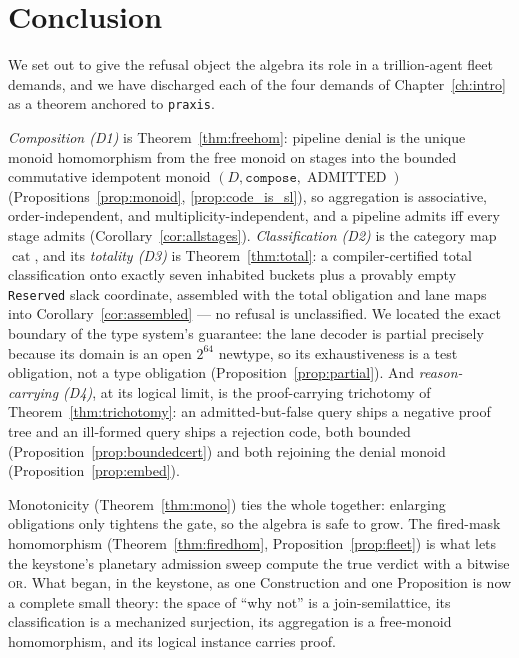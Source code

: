 \documentclass[11pt,oneside]{book}
\theoremstyle{definition}
\theoremstyle{plain}
\theoremstyle{remark}
\newcommand{\code}[1]{\texttt{#1}}
\newcommand{\Deny}{D}                 %
\newcommand{\Adml}{\operatorname{ADMITTED}}          %
\DeclareMathOperator{\catop}{cat}
\begin{document}
\chapter{Conclusion}
\label{ch:concl}

We set out to give the refusal object the algebra its role in a trillion-agent fleet demands, and we have discharged each of the four demands of Chapter~\ref{ch:intro} as a theorem anchored to \code{praxis}. %

\emph{Composition (D1)} is Theorem~\ref{thm:freehom}: pipeline denial is the unique monoid homomorphism from the free monoid on stages into the bounded commutative idempotent monoid $(\Deny,\code{compose},\Adml)$ (Propositions~\ref{prop:monoid}, \ref{prop:code_is_sl}), so aggregation is associative, order-independent, and multiplicity-independent, and a pipeline admits iff every stage admits (Corollary~\ref{cor:allstages}). %
\emph{Classification (D2)} is the category map $\catop$, and its \emph{totality (D3)} is Theorem~\ref{thm:total}: a compiler-certified total classification onto exactly seven inhabited buckets plus a provably empty \code{Reserved} slack coordinate, assembled with the total obligation and lane maps into Corollary~\ref{cor:assembled} --- no refusal is unclassified. %
We located the exact boundary of the type system's guarantee: the lane decoder is partial precisely because its domain is an open $2^{64}$ newtype, so its exhaustiveness is a test obligation, not a type obligation (Proposition~\ref{prop:partial}). %
And \emph{reason-carrying (D4)}, at its logical limit, is the proof-carrying trichotomy of Theorem~\ref{thm:trichotomy}: an admitted-but-false query ships a negative proof tree and an ill-formed query ships a rejection code, both bounded (Proposition~\ref{prop:boundedcert}) and both rejoining the denial monoid (Proposition~\ref{prop:embed}). %

Monotonicity (Theorem~\ref{thm:mono}) ties the whole together: enlarging obligations only tightens the gate, so the algebra is safe to grow. %
The fired-mask homomorphism (Theorem~\ref{thm:firedhom}, Proposition~\ref{prop:fleet}) is what lets the keystone's planetary admission sweep compute the true verdict with a bitwise \textsc{or}. %
What began, in the keystone, as one Construction and one Proposition is now a complete small theory: the space of ``why not'' is a join-semilattice, its classification is a mechanized surjection, its aggregation is a free-monoid homomorphism, and its logical instance carries proof. %
\end{document}
